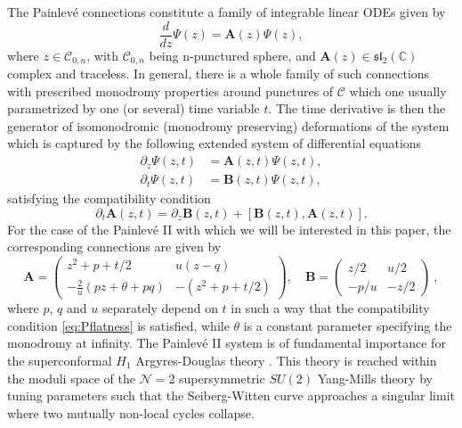 \documentclass[a4paper,11pt]{article}
\numberwithin{equation}{section}
\begin{document}
The Painlev\'e connections constitute a family of integrable linear ODEs given by
\begin{equation}
    \frac{d}{dz} \Psi(z) = \mathbf{A}(z) \Psi(z),
\end{equation}
where $z \in \mathcal{C}_{0,n}$, with $\mathcal{C}_{0,n}$ being n-punctured sphere, and $\mathbf{A}(z) \in \mathfrak{sl}_2(\mathbb{C})$ complex and traceless. In general, there is a whole family of such connections with prescribed monodromy properties around punctures of $\mathcal{C}$ which one usually parametrized by one (or several) time variable $t$. The time derivative is then the generator of isomonodromic (monodromy preserving) deformations of the system which is captured by the following extended system of differential equations
\begin{align}
\label{eq:compatibilitycl}
    \partial_z \Psi(z,t) &= \mathbf{A}(z,t) \Psi(z,t), \\
    \partial_t \Psi(z,t) &= \mathbf{B}(z,t) \Psi(z,t),
\end{align}
satisfying the compatibility condition
\begin{equation} \label{eq:Pflatness}
    \partial_t \mathbf{A}(z,t) = \partial_z \mathbf{B}(z,t) + [\mathbf{B}(z,t), \mathbf{A}(z,t)].
\end{equation}
For the case of the Painlev\'e II with which we will be interested in this paper, the corresponding connections are given by
\begin{equation}
\label{eq:Laxpaircl}
    \mathbf{A} = \left(\begin{array}{cc}
        z^2 + p + t/2 & u(z-q) \\
        -\frac{2}{u}(pz + \theta + pq) & - (z^2 + p + t/2) 
    \end{array}\right), \quad \mathbf{B} = \left(\begin{array}{cc}
        z/2 & u/2 \\
        -p/u & -z/2
    \end{array}\right)~,
\end{equation}
where $p$, $q$ and $u$ separately depend on $t$ in such a way that the compatibility condition \eqref{eq:Pflatness} is satisfied, while $\theta$ is a constant parameter specifying the monodromy at infinity. The Painlev\'e II system is of fundamental importance for the superconformal $H_1$ Argyres-Douglas theory \cite{Bonelli:2016qwg}. This theory is reached within the moduli space of the $\mathcal{N}=2$ supersymmetric $SU(2)$ Yang-Mills theory by tuning parameters such that the Seiberg-Witten curve approaches a singular limit where two mutually non-local cycles collapse.
\end{document}
